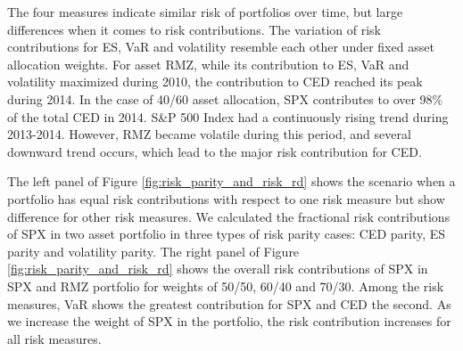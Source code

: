 \documentclass[11pt]{article}
\begin{document}
The four measures indicate similar risk of portfolios over time, but large differences when it comes to risk contributions. The variation of risk contributions for ES, VaR and volatility resemble each other under fixed asset allocation weights. For asset RMZ, while its contribution to ES, VaR and volatility maximized during 2010, the contribution to CED reached its peak during 2014. In the case of 40/60 asset allocation, SPX contributes to over 98\% of the total CED in 2014. S\&P 500 Index had a continuously rising trend during 2013-2014. However, RMZ became volatile during this period, and several downward trend occurs, which lead to the major risk contribution for CED.

The left panel of Figure \ref{fig:risk_parity_and_risk_rd} shows the scenario when a portfolio has equal risk contributions with respect to one risk measure but show difference for other risk measures. We calculated the fractional risk contributions of SPX in two asset portfolio in three types of risk parity cases: CED parity, ES parity and volatility parity. The right panel of Figure \ref{fig:risk_parity_and_risk_rd} shows the overall risk contributions of SPX in SPX and RMZ portfolio for weights of 50/50, 60/40 and 70/30. Among the risk measures, VaR shows the greatest contribution for SPX and CED the second. As we increase the weight of SPX in the portfolio, the risk contribution increases for all risk measures. 
\end{document}
